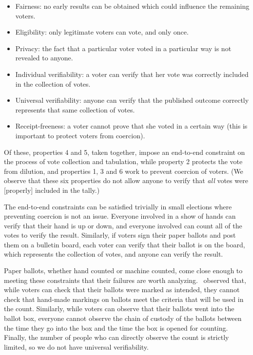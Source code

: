 \begin{itemize}
  \item Fairness: no early results can be obtained which could influence the
    remaining voters.
  \item Eligibility: only legitimate voters can vote, and only once.
  \item Privacy: the fact that a particular voter voted in a particular way
    is not revealed to anyone.
  \item Individual verifiability: a voter can verify that her vote was
    correctly included in the collection of votes.
  \item Universal verifiability: anyone can verify that the published
    outcome correctly represents that same collection of votes.
  \item Receipt-freeness: a voter cannot prove that she voted in a certain
    way (this is important to protect voters from coercion).
\end{itemize}

Of these, properties 4 and 5, taken together, impose an end-to-end
constraint on the process of vote collection and tabulation, while property
2 protects the vote from dilution, and properties 1, 3 and 6 work to prevent
coercion of voters. (We observe that these six properties do not allow
anyone to verify that \emph{all} votes were [properly] included in the
tally.)

The end-to-end constraints can be satisfied trivially in small elections
where preventing coercion is not an issue.  Everyone involved in a show of
hands can verify that their hand is up or down, and everyone involved can
count all of the votes to verify the result.  Similarly, if voters sign
their paper ballots and post them on a bulletin board, each voter can verify
that their ballot is on the board, which represents the collection of votes,
and anyone can verify the result.

Paper ballots, whether hand counted or machine counted, come close enough to
meeting these constraints that their failures are worth analyzing.
\cite{jones2002}~observed that, while voters can check that their ballots
were marked as intended, they cannot check that hand-made markings on
ballots meet the criteria that will be used in the count.  Similarly, while
voters can observe that their ballots went into the ballot box, everyone
cannot observe the chain of custody of the ballots between the time they go
into the box and the time the box is opened for counting.  Finally, the
number of people who can directly observe the count is strictly limited, so
we do not have universal verifiability.

